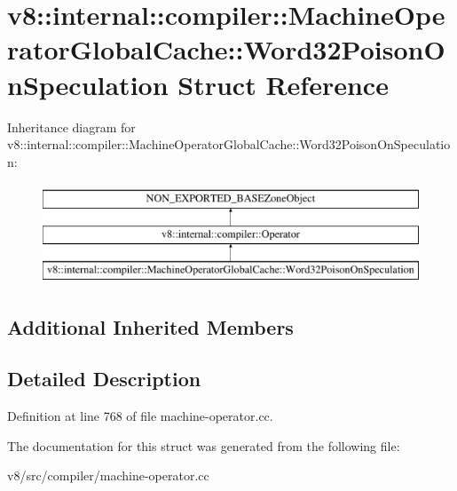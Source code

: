 \hypertarget{structv8_1_1internal_1_1compiler_1_1MachineOperatorGlobalCache_1_1Word32PoisonOnSpeculation}{}\section{v8\+:\+:internal\+:\+:compiler\+:\+:Machine\+Operator\+Global\+Cache\+:\+:Word32\+Poison\+On\+Speculation Struct Reference}
\label{structv8_1_1internal_1_1compiler_1_1MachineOperatorGlobalCache_1_1Word32PoisonOnSpeculation}
Inheritance diagram for v8\+:\+:internal\+:\+:compiler\+:\+:Machine\+Operator\+Global\+Cache\+:\+:Word32\+Poison\+On\+Speculation\+:\begin{figure}[H]
\begin{center}
\leavevmode
\includegraphics[height=3.000000cm]{structv8_1_1internal_1_1compiler_1_1MachineOperatorGlobalCache_1_1Word32PoisonOnSpeculation}
\end{center}
\end{figure}
\subsection*{Additional Inherited Members}


\subsection{Detailed Description}


Definition at line 768 of file machine-\/operator.\+cc.



The documentation for this struct was generated from the following file\+:\begin{DoxyCompactItemize}
\item 
v8/src/compiler/machine-\/operator.\+cc\end{DoxyCompactItemize}
